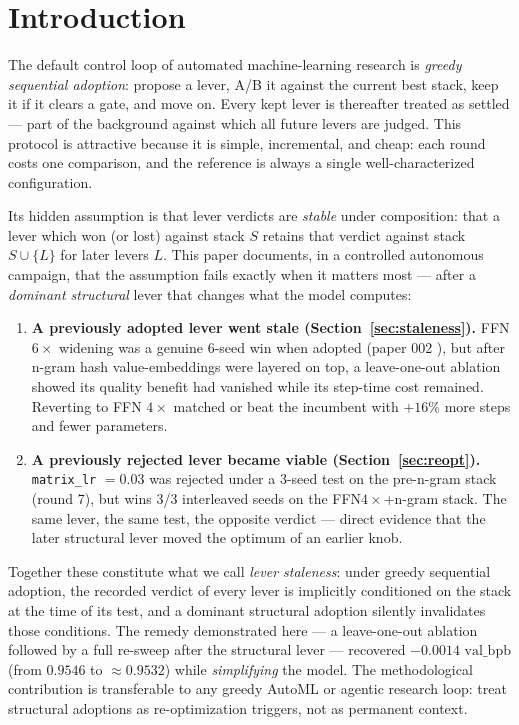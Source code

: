 \documentclass{article}
\newcommand{\valbpb}{\mathrm{val\_bpb}}
\begin{document}
\section{Introduction}
\label{sec:intro}

The default control loop of automated machine-learning research is \emph{greedy sequential adoption}: propose a lever, A/B it against the current best stack, keep it if it clears a gate, and move on. Every kept lever is thereafter treated as settled --- part of the background against which all future levers are judged. This protocol is attractive because it is simple, incremental, and cheap: each round costs one comparison, and the reference is always a single well-characterized configuration.

Its hidden assumption is that lever verdicts are \emph{stable} under composition: that a lever which won (or lost) against stack $S$ retains that verdict against stack $S \cup \{L\}$ for later levers $L$. This paper documents, in a controlled autonomous campaign, that the assumption fails exactly when it matters most --- after a \emph{dominant structural} lever that changes what the model computes:

\begin{enumerate}
    \item \textbf{A previously adopted lever went stale (Section~\ref{sec:staleness}).} FFN $6\times$ widening was a genuine 6-seed win when adopted (paper 002 \cite{ophis2026ffn}), but after n-gram hash value-embeddings \cite{ophis2026ngram} were layered on top, a leave-one-out ablation showed its quality benefit had vanished while its step-time cost remained. Reverting to FFN $4\times$ matched or beat the incumbent with $+16\%$ more steps and fewer parameters.
    \item \textbf{A previously rejected lever became viable (Section~\ref{sec:reopt}).} \texttt{matrix\_lr} $= 0.03$ was rejected under a 3-seed test on the pre-n-gram stack (round 7), but wins 3/3 interleaved seeds on the FFN$4\times$+n-gram stack. The same lever, the same test, the opposite verdict --- direct evidence that the later structural lever moved the optimum of an earlier knob.
\end{enumerate}

Together these constitute what we call \emph{lever staleness}: under greedy sequential adoption, the recorded verdict of every lever is implicitly conditioned on the stack at the time of its test, and a dominant structural adoption silently invalidates those conditions. The remedy demonstrated here --- a leave-one-out ablation followed by a full re-sweep after the structural lever --- recovered $-0.0014$ $\valbpb$ (from $0.9546$ to $\approx 0.9532$) while \emph{simplifying} the model. The methodological contribution is transferable to any greedy AutoML or agentic research loop: treat structural adoptions as re-optimization triggers, not as permanent context.
\end{document}
